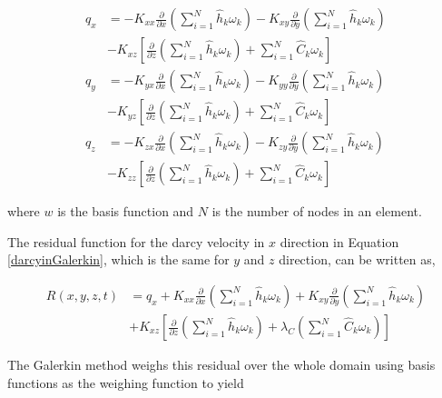 \begin{equation}\label{darcyinGalerkin}
\begin{split}
q _x &= -K _{xx} \frac{\partial }{\partial x}\left(\sum_{i=1}^{N}{\hat h _k \omega _k}\right)
 -K _{xy} \frac{\partial }{\partial y} \left(\sum_{i=1}^{N}{\hat h _k \omega _k}\right) \\
 &-K _{xz} \left[\frac{\partial }{\partial z} \left(\sum_{i=1}^{N}{\hat h _k \omega _k}\right)
+\sum_{i=1}^{N}{\hat C _k \omega _k}\right] \\
q _y &= -K _{yx} \frac{\partial }{\partial x}\left(\sum_{i=1}^{N}{\hat h _k \omega _k}\right)
 -K _{yy} \frac{\partial }{\partial y} \left(\sum_{i=1}^{N}{\hat h _k \omega _k}\right) \\
 &-K _{yz} \left[\frac{\partial }{\partial z} \left(\sum_{i=1}^{N}{\hat h _k \omega _k}\right)
+\sum_{i=1}^{N}{\hat C _k \omega _k}\right] \\
q _z &= -K _{zx} \frac{\partial }{\partial x}\left(\sum_{i=1}^{N}{\hat h _k \omega _k}\right)
 -K _{zy} \frac{\partial }{\partial y} \left(\sum_{i=1}^{N}{\hat h _k \omega _k}\right) \\
 &-K _{zz} \left[\frac{\partial }{\partial z} \left(\sum_{i=1}^{N}{\hat h _k \omega _k}\right)
+\sum_{i=1}^{N}{\hat C _k \omega _k}\right]
\end{split}
\end{equation}

where $w$ is the basis function and $N$ is the number of nodes in an element.

The residual function for the darcy velocity in $x$ direction in Equation \ref{darcyinGalerkin}, which is the same for $y$ and $z$ direction, can be written as,

\begin{equation}\label{ResidualDarcy}
\begin{split}
R(x,y,z,t) &=q _x + K _{xx} \frac{\partial}{\partial x}\left(\sum_{i=1}^{N}{\hat h _k \omega _k}\right) + K _{xy} \frac{\partial}{\partial y}\left(\sum_{i=1}^{N}{\hat h _k \omega _k}\right) \\
&+K _{xz} \left[\frac{\partial}{\partial z}\left(\sum_{i=1}^{N}{\hat h _k \omega _k}\right) + \lambda _C \left(\sum_{i=1}^{N}{\hat C _k \omega _k}\right) \right]
\end{split}
\end{equation}

The Galerkin method weighs this residual over the whole domain using basis functions as the weighing function to yield

